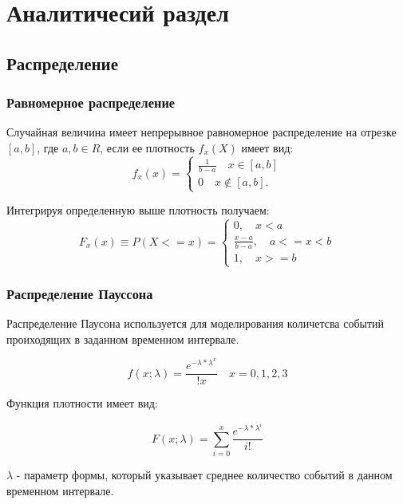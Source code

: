 \section{Аналитичесий раздел}

\subsection{Распределение}

\subsubsection{Равномерное распределение}

Случайная величина имеет непрерывное равномерное распределение на отрезке $[a,b]$, где $a,b \in R $, если ее плотность $f_x(X)$ имеет вид:
\begin{equation}
f_x(x)=\begin{cases}
\frac{1}{b-a} \quad x \in [a,b] \\
0 \quad x \notin [a,b].
\end{cases}
\end{equation}

Интегрируя определенную выше плотность получаем:
\begin{equation}
F_x(x) \equiv P(X <= x) = \begin{cases}
	0, \quad x < a \\
	\frac{x - a}{b - a}, \quad a <= x < b \\
	1, \quad x >= b
\end{cases}
\end{equation}

\subsubsection{Распределение Пауссона}

Распределение Паусона используется для моделирования количетсва событий проиходящих в заданном временном интервале.


\begin{equation}
f(x; \lambda) = \frac{e^{-\lambda * \lambda^x}}{!x} \quad x = 0, 1, 2, 3
\end{equation}

Функция плотности имеет вид:

\begin{equation}
	F(x; \lambda) = \sum_{i=0}^{x}\frac{e^{-\lambda * \lambda^i}}{i!} 
\end{equation}

$\lambda$ - параметр формы, который указывает среднее количество событий в данном временном интервале.


